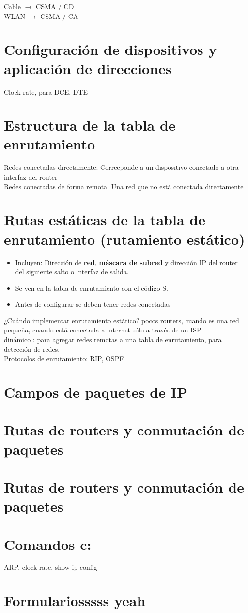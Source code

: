 \documentclass[letterpaper,12pt]{article}
\begin{document}
\begin{sloppypar}
Cable $\rightarrow$ CSMA / CD
\vspace{0.3cm}\\  
WLAN $\rightarrow$ CSMA / CA

\section{Configuración de dispositivos y aplicación de direcciones}
Clock rate, para DCE, DTE

\section{Estructura de la tabla de enrutamiento}
Redes conectadas directamente: Correcponde a un dispositivo conectado a otra interfaz del router
\vspace{0.3cm}\\ 
Redes conectadas de forma remota: Una red que no está conectada directamente 

\section{Rutas estáticas de la tabla de enrutamiento (rutamiento estático)}
\begin{itemize}
  \item Incluyen: Dirección de \textbf{red}, \textbf{máscara de subred} y dirección IP del router del siguiente salto o interfaz de salida.
  \item Se ven en la tabla de enrutamiento con el código S. 
  \item Antes de configurar se deben tener redes conectadas
\end{itemize}

¿Cuándo implementar enrutamiento estático? pocos routers, cuando es una red pequeña, cuando está conectada a internet sólo a través de un ISP
\vspace{0.3cm}\\ 
dinámico : para agregar redes remotas a una tabla de enrutamiento, para detección de redes.
\vspace{0.3cm}\\ 
Protocolos de enrutamiento: RIP, OSPF 

\section{Campos de paquetes de IP}
\section{Rutas de routers y conmutación de paquetes}
\section{Rutas de routers y conmutación de paquetes}
\section{Comandos c:}
ARP, clock rate, show ip config
\newpage
\section{Formulariosssss yeah}

\end{sloppypar}
\end{document}
